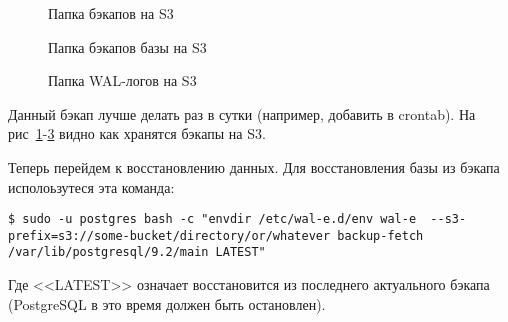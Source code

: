 \begin{figure}[h!]
  \caption{Папка бэкапов на S3}
  \label{fig:wal-e1}
\end{figure}

\begin{figure}[h!]
  \caption{Папка бэкапов базы на S3}
  \label{fig:wal-e2}
\end{figure}

\begin{figure}[h!]
  \caption{Папка WAL-логов на S3}
  \label{fig:wal-e3}
\end{figure}

Данный бэкап лучше делать раз в сутки (например, добавить в crontab). На рис~\ref{fig:wal-e1}-\ref{fig:wal-e3} видно как хранятся бэкапы на S3. 

Теперь перейдем к восстановлению данных. Для восстановления базы из бэкапа исполоьзутеся эта команда:

\begin{lstlisting}[label=lst:wal-e10,caption=Восстановление бэкапа базы из S3]
$ sudo -u postgres bash -c "envdir /etc/wal-e.d/env wal-e  --s3-prefix=s3://some-bucket/directory/or/whatever backup-fetch /var/lib/postgresql/9.2/main LATEST"
\end{lstlisting}

Где <<LATEST>> означает восстановится из последнего актуального бэкапа (PostgreSQL в это время должен быть остановлен).